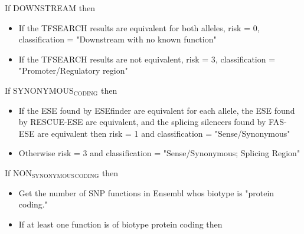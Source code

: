\documentclass[11pt]{article}
\begin{document}

\item If DOWNSTREAM then\\
\label{sec-3_4_2_8}%
\begin{itemize}

\item If the TFSEARCH results are equivalent for both alleles, risk = 0, classification = "Downstream with no known function"\\
\label{sec-3_4_2_8_1}%
\item If the TFSEARCH results are not equivalent, risk = 3, classification = "Promoter/Regulatory region"\\
\label{sec-3_4_2_8_2}%
\end{itemize} %

\item If SYNONYMOUS$_{\mathrm{CODING}}$ then\\
\label{sec-3_4_2_9}%
\begin{itemize}

\item If the ESE found by ESEfinder are equivalent for each allele, the ESE found by RESCUE-ESE are equivalent, and the splicing silencers found by FAS-ESE are equivalent then risk = 1 and classification = "Sense/Synonymous"\\
\label{sec-3_4_2_9_1}%
\item Otherwise risk = 3 and classification = "Sense/Synonymous; Splicing Region"\\
\label{sec-3_4_2_9_2}%
\end{itemize} %

\item If NON$_{\mathrm{SYNONYMOUS}}$$_{\mathrm{CODING}}$ then\\
\label{sec-3_4_2_10}%
\begin{itemize}

\item Get the number of SNP functions in Ensembl whos biotype is "protein coding."\\
\label{sec-3_4_2_10_1}%
\item If at least one function is of biotype protein coding then\\
\label{sec-3_4_2_10_2}%
\begin{itemize}


\end{itemize}
\end{itemize}
\end{document}

